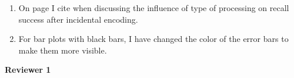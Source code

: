 \documentclass[12pt]{article}
\begin{document}
\begin{enumerate}
\item
	On page \pageref{newcite} I cite  when discussing the influence of type of processing on recall success after incidental encoding.

\item
	For bar plots with black bars, I have changed the color of the error bars to make them more visible. 


\end{enumerate}


\vspace{20pt}

\textbf{\large{Reviewer 1}}
\end{document}
